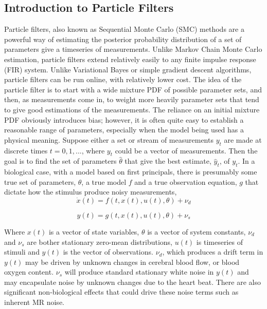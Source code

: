 \documentclass{article}
\begin{document}
\subsection*{Introduction to Particle Filters}
Particle filters, also known as Sequential Monte Carlo (SMC) methods
are a powerful way of estimating the posterior probability distribution
of a set of parameters give a timeseries of measurements. Unlike Markov 
Chain Monte Carlo estimation, particle
filters extend relatively easily to any finite impulse response (FIR) system.
Unlike Variational Bayes or simple gradient descent algorithms, particle
filters can be run online, with relatively lower cost. The idea of the particle
filter is to start with a wide mixture PDF of possible parameter sets, 
and then, as measurements come in, to weight more heavily parameter sets 
that tend to give good estimations of the measurements. The reliance on
an initial mixture PDF obviously introduces bias; however, it is often quite
easy to establish a reasonable range of parameters, especially when the
model being used has a physical meaning. Suppose either a set or stream
of measurements $y_t$ are made at discrete times $t = 0, 1, ... $, where
$y_t$ could be a vector of measurements. Then the goal is to find the set
of parameters $\hat{\theta}$ that give the best estimate, $\hat{y}_t$, of $y_t$.
In a biological case, with a model based on first principals, there is 
presumably some true set of parameters, $\theta$, a true model $f$
and a true observation equation, $g$ that dictate how the stimulus 
produce noisy measurements,
\begin{equation}
\dot{x}(t) = f(t, x(t), u(t), \theta) + \nu_d
\end{equation}

\begin{equation}
y(t) = g(t, x(t), u(t), \theta) + \nu_s
\end{equation}

Where $x(t)$ is a vector of state variables, $\theta$ is a vector of system
constants, $\nu_d$ and $\nu_s$ are bother stationary zero-mean distributions, $u(t)$
is timeseries of stimuli and
$y(t)$ is the vector of observations. $\nu_d$, which produces a drift term in $y(t)$
may be driven by unknown changes in 
cerebral blood flow, or blood oxygen content. $\nu_s$ will produce standard
stationary white noise in $y(t)$ and may encapsulate noise by unknown changes due 
to the heart beat. There are also significant non-biological effects that 
could drive these noise terms such as inherent MR noise. 
\end{document}
